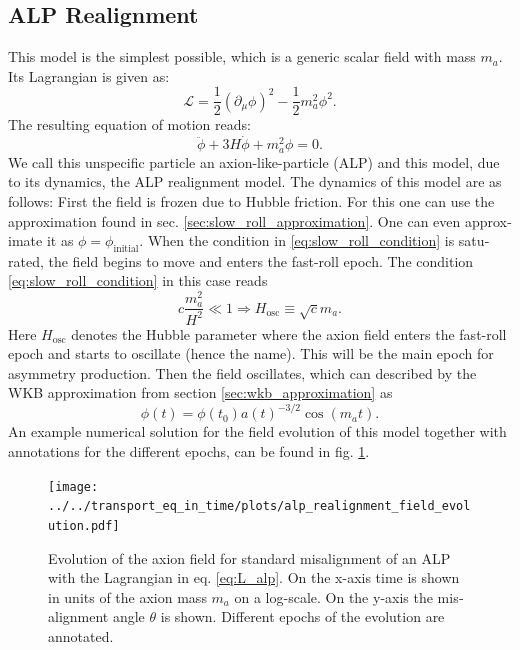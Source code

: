 \documentclass[master,       %
               twoside,        %
               BCOR10mm,       %
               english,ngerman, %
               ]{GAUBM}
\begin{document}
\begin{otherlanguage}{english}
\section{ALP Realignment}
This model is the simplest possible, which is a generic scalar field with mass $m_a$. Its Lagrangian is given as:
\begin{equation}
	\mathcal{L} = \frac{1}{2} \left( \partial_\mu \phi \right)^2 - \frac{1}{2} m_a^2 \phi^2.
	\label{eq:L_alp}
\end{equation}
The resulting equation of motion reads:
\begin{equation}
	\ddot{\phi} + 3 H \dot{\phi} + m_a^2 \phi = 0.
\end{equation}
We call this unspecific particle an axion-like-particle (ALP) and this model, due to its dynamics, the ALP realignment model.
The dynamics of this model are as follows:
First the field is frozen due to Hubble friction. For this one can use the approximation found in sec. \ref{sec:slow_roll_approximation}. One can even approximate it as $\phi = \phi_\mathrm{initial}$.
When the condition in \eqref{eq:slow_roll_condition} is saturated, the field begins to move and enters the fast-roll epoch. The condition \eqref{eq:slow_roll_condition} in this case reads
\begin{equation}
	c \frac{m_a^2}{H^2} \ll 1 \Rightarrow H_\mathrm{osc} \equiv \sqrt{c} m_a.
\end{equation}
Here $H_\mathrm{osc}$ denotes the Hubble parameter where the axion field enters the fast-roll epoch and starts to oscillate (hence the name).
This will be the main epoch for asymmetry production.
Then the field oscillates, which can described by the WKB approximation from section \ref{sec:wkb_approximation} as
\begin{equation}
	\phi(t) = \phi(t_0) a(t)^{-3/2} \cos(m_a t).
\end{equation}
An example numerical solution for the field evolution of this model together with annotations for the different epochs, can be found in fig. \ref{fig:alp_realignment_time_evolution}.
\begin{figure}[H]
	\label{fig:alp_realignment_time_evolution}
    \texttt{[image: ../../transport\_eq\_in\_time/plots/alp\_realignment\_field\_evolution.pdf]}
    \caption{Evolution of the axion field for standard misalignment of an ALP with the Lagrangian in eq. \eqref{eq:L_alp}. On the x-axis time is shown in units of the axion mass $m_a$ on a log-scale. On the y-axis the misalignment angle $\theta$ is shown. Different epochs of the evolution are annotated.}

\end{figure}
\end{otherlanguage}
\end{document}
